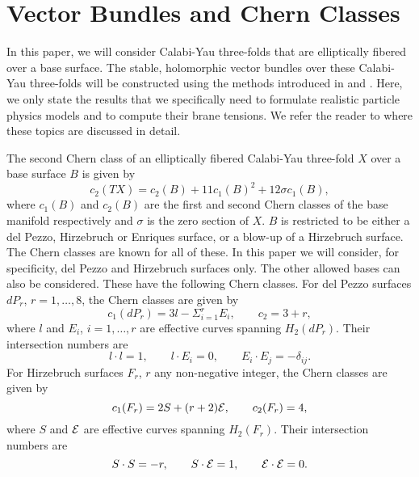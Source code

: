\documentclass[a4paper,12pt]{article}
\numberwithin{equation}{section}
\theoremstyle{plain}
\begin{document}
\section{Vector Bundles and Chern Classes}

In this paper, we will consider Calabi-Yau three-folds that are elliptically
fibered over a base surface. The stable, holomorphic vector
bundles over these Calabi-Yau three-folds will be constructed using the methods
introduced in \cite{FMW1,AJ,FMW2} and \cite{RD1,RD2,RD3,RD4,C}. 
Here, we only state the results that we
specifically need to formulate realistic particle physics models and to
compute their brane tensions. We refer the reader to 
\cite{RD1,RD2,RD3,RD4} where these topics are discussed in detail.

The second Chern class of an elliptically fibered Calabi-Yau three-fold
$X$ over a base surface $B$ is given by
%
\begin{equation}
c_{2}(TX)= c_{2}(B)+11c_{1}(B)^{2}+12 \sigma c_{1}(B),
\label{eq:36}
\end{equation}
%
where $c_{1}(B)$ and $c_{2}(B)$ are the first and second Chern classes of
the base manifold respectively and $\sigma$ is the zero section of $X$. 
$B$ is restricted to be either a
del Pezzo, Hirzebruch or Enriques surface, or a blow-up of a Hirzebruch
surface. The Chern classes are known for all of these. In this paper
we will consider, for specificity, del Pezzo and Hirzebruch surfaces only. 
The other allowed bases can also be considered. These have the
following Chern classes. For del Pezzo surfaces $dP_{r}$, $r=1,\dots,8$, the
Chern classes are given by
%
\begin{equation}
c_{1}(dP_{r})=3l-\Sigma_{i=1}^{r}E_{i}, \qquad c_{2}=3+r,
\label{eq:37}
\end{equation}
%
where $l$ and $E_{i}$, $i=1,\dots,r$ are effective curves spanning
$H_{2}(dP_{r})$. Their intersection numbers are
%
\begin{equation}
l \cdot l=1, \qquad l \cdot E_{i}=0, \qquad E_{i} \cdot E_{j}=-\delta_{ij}.
\label{eq:38}
\end{equation}
%
For Hirzebruch surfaces $F_{r}$, $r$ any non-negative integer, the Chern
classes are given by
%
\begin{equation}
c_{1}(F_{r})=2S+(r+2){\cal{E}}, \qquad c_{2}(F_{r}) =4,
\label{eq:39}
\end{equation}
%
where $S$ and $\cal{E}$ are effective curves spanning $H_{2}(F_{r})$. Their
intersection numbers are
%
\begin{equation}
S \cdot S=-r, \qquad S \cdot {\cal{E}}=1, \qquad {\cal{E}} \cdot {\cal{E}}=0.
\label{eq:40}
\end{equation}
%
\end{document}

